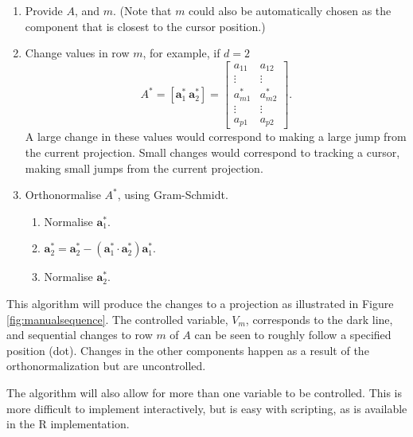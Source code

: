 \documentclass[]{interact}
\theoremstyle{plain}%
\theoremstyle{definition}
\theoremstyle{remark}
\providecommand{\tightlist}{%
  \setlength{\itemsep}{0pt}\setlength{\parskip}{0pt}}
\def\tightlist{}
\begin{document}
\begin{enumerate}
\def\labelenumi{\arabic{enumi}.}
\tightlist
\item
  Provide \(A\), and \(m\). (Note that \(m\) could also be automatically
  chosen as the component that is closest to the cursor position.)
\item
  Change values in row \(m\), for example, if \(d=2\) \[
  A^* = [ \boldsymbol{a}^*_1~\boldsymbol{a}^*_2 ] = \left[ \begin{array}{cc} a_{11} & a_{12}\\
                             \vdots & \vdots \\
                             a^*_{m1} & a^*_{m2}\\
                             \vdots & \vdots \\
                             a_{p1} & a_{p2} 
       \end{array}\right].
  \] \noindent A large change in these values would correspond to making
  a large jump from the current projection. Small changes would
  correspond to tracking a cursor, making small jumps from the current
  projection.
\item
  Orthonormalise \(A^*\), using Gram-Schmidt.

  \begin{enumerate}
  \def\labelenumii{\roman{enumii}.}
  \tightlist
  \item
    Normalise \(\boldsymbol{a}^*_1\).
  \item
    \(\boldsymbol{a}^*_2 = \boldsymbol{a}^*_2 - (\boldsymbol{a}^*_1\cdot\boldsymbol{a}^*_2)\boldsymbol{a}^*_1\).
  \item
    Normalise \(\boldsymbol{a}^*_2\).
  \end{enumerate}
\end{enumerate}

This algorithm will produce the changes to a projection as illustrated
in Figure \ref{fig:manualsequence}. The controlled variable, \(V_m\),
corresponds to the dark line, and sequential changes to row \(m\) of
\(A\) can be seen to roughly follow a specified position (dot). Changes
in the other components happen as a result of the orthonormalization but
are uncontrolled.

The algorithm will also allow for more than one variable to be
controlled. This is more difficult to implement interactively, but is
easy with scripting, as is available in the R implementation.
\end{document}
